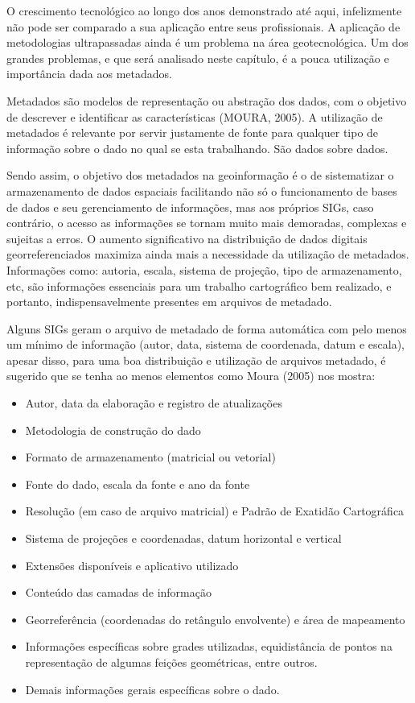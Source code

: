 		O crescimento tecnológico ao longo dos anos demonstrado até aqui, infelizmente não pode ser comparado a sua aplicação entre seus profissionais. A aplicação de metodologias ultrapassadas ainda é um problema na área geotecnológica. Um dos grandes problemas, e que será analisado neste capítulo, é a pouca utilização e importância dada aos metadados.
		
		Metadados são modelos de representação ou abstração dos dados, com o objetivo de descrever e identificar as características (MOURA, 2005). A utilização de metadados é relevante por servir justamente de fonte para qualquer tipo de informação sobre o dado no qual se esta trabalhando. São dados sobre dados.
		
		Sendo assim, o objetivo dos metadados na geoinformação é o de sistematizar o armazenamento de dados espaciais facilitando não só o funcionamento de bases de dados e seu gerenciamento de informações, mas aos próprios SIGs, caso contrário, o acesso as informações se tornam muito mais demoradas, complexas e sujeitas a erros. O aumento significativo na distribuição de dados digitais georreferenciados maximiza ainda mais a necessidade da utilização de metadados. Informações como: autoria, escala, sistema de projeção, tipo de armazenamento, etc, são informações essenciais para um trabalho cartográfico bem realizado, e portanto, indispensavelmente presentes em arquivos de metadado.
		
		Alguns SIGs geram o arquivo de metadado de forma automática com pelo menos um mínimo de informação (autor, data, sistema de coordenada, datum e escala), apesar disso, para uma boa distribuição e utilização de arquivos metadado, é sugerido que se tenha ao menos elementos como Moura (2005) nos mostra:
		
		\begin{itemize}
			\item Autor, data da elaboração e registro de atualizações
			\item Metodologia de construção do dado
			\item Formato de armazenamento (matricial ou vetorial)
			\item Fonte do dado, escala da fonte e ano da fonte
			\item Resolução (em caso de arquivo matricial) e Padrão de Exatidão Cartográfica
			\item Sistema de projeções e coordenadas, datum horizontal e vertical
			\item Extensões disponíveis e aplicativo utilizado
			\item Conteúdo das camadas de informação
			\item Georreferência (coordenadas do retângulo envolvente) e área de mapeamento
			\item Informações específicas sobre grades utilizadas, equidistância de pontos na representação de algumas feições geométricas, entre outros.
			\item Demais informações gerais específicas sobre o dado.
		\end{itemize}
		
